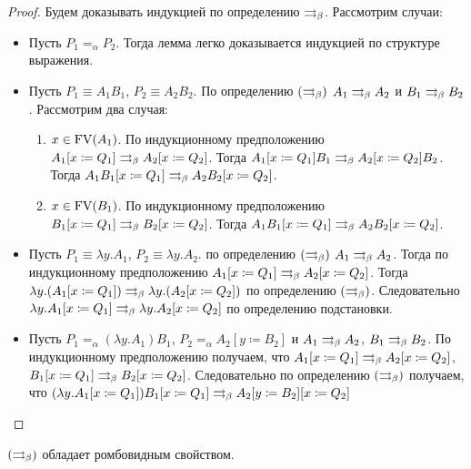 \begin{proof}
	Будем доказывать индукцией по определению $\rightrightarrows_{\beta} $. Рассмотрим случаи:
	\begin{itemize}
		\item Пусть $P_{1}=_{\alpha}P_{2}$. Тогда лемма легко доказывается индукцией по структуре выражения.
		\item Пусть $P_{1}\equiv{}A_{1}B_{1}$, $P_{2}\equiv{}A_{2}B_{2}$. По определению $(\rightrightarrows_{\beta})$ $A_{1} \rightrightarrows_{\beta} A_{2}$ и $B_{1} \rightrightarrows_{\beta} B_{2}$.
		Рассмотрим два случая:
		\begin{enumerate}
			\item $x \in \operatorname{FV}(A_{1})$. По индукционному предположению $A_{1}[x\coloneqq{}Q_{1}] \rightrightarrows_{\beta} A_{2}[x\coloneqq{}Q_{2}]$. Тогда $A_{1}[x\coloneqq{}Q_{1}]B_{1} \rightrightarrows_{\beta} A_{2}[x\coloneqq{}Q_{2}]B_{2}$. Тогда $A_{1}B_{1}[x\coloneqq{}Q_{1}] \rightrightarrows_{\beta} A_{2}B_{2}[x\coloneqq{}Q_{2}]$.
			\item $x \in \operatorname{FV}(B_{1})$. По индукционному предположению $B_{1}[x\coloneqq{}Q_{1}] \rightrightarrows_{\beta} B_{2}[x\coloneqq{}Q_{2}]$. Тогда $A_{1}B_{1}[x\coloneqq{}Q_{1}] \rightrightarrows_{\beta} A_{2}B_{2}[x\coloneqq{}Q_{2}]$.
		\end{enumerate}
		\item Пусть $P_{1}\equiv{}\lambda{}y.A_{1}$, $P_{2}\equiv{}\lambda{}y.A_{2}$. по определению $(\rightrightarrows_{\beta})$ $A_{1}\rightrightarrows_{\beta} A_{2}$. Тогда по индукционному предположению $A_{1}[x\coloneqq{}Q_{1}] \rightrightarrows_{\beta} A_{2}[x\coloneqq{}Q_{2}]$. Тогда 
		$\lambda{}y.(A_{1}[x\coloneqq{}Q_{1}]) \rightrightarrows_{\beta} \lambda{}y.(A_{2}[x\coloneqq{}Q_{2}])$ по определению $(\rightrightarrows_{\beta})$. Следовательно 	$\lambda{}y.A_{1}[x\coloneqq{}Q_{1}] \rightrightarrows_{\beta} \lambda{}y.A_{2}[x\coloneqq{}Q_{2}]$ по определению подстановки.
		\item Пусть $P_{1}=_\alpha(\lambda{}y.A_1)B_1$, $P_{2}=_\alpha A_2[y\coloneqq{}B_2]$ и $ A_1 \rightrightarrows_{\beta} A_2 $, $ B_1 \rightrightarrows_{\beta} B_2 $. По индукционному предположению получаем, что $A_1[x \coloneqq Q_1] \rightrightarrows_{\beta} A_2[x \coloneqq Q_2]$, $B_1[x \coloneqq Q_1] \rightrightarrows_{\beta} B_2[x \coloneqq Q_2]$. Следовательно по определению $(\rightrightarrows_{\beta})$ получаем, что $ (\lambda{}y.A_1[x\coloneqq Q_1])B_1[x \coloneqq Q_1] \rightrightarrows_{\beta}  A_2[y \coloneqq B_2][x \coloneqq Q_2]$
	\end{itemize}
\end{proof}

\begin{lemma}
	$(\rightrightarrows_{\beta})$ обладает ромбовидным свойством.
\end{lemma}

